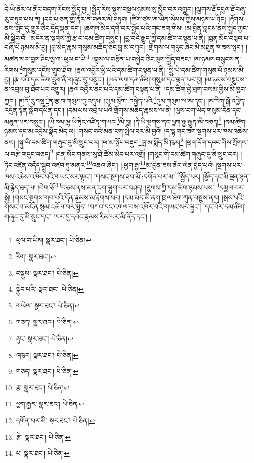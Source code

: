 དེ་ཡི་ནོར་ལ་ནོར་བདག་ལོངས་སྤྱོད་བྱ། །སྤྱོད་རེས་སྡུག་བསྔལ་ཉམས་སུ་མྱོང་བར་འགྱུར། །ལྕགས་རྡོ་དངུལ་རྡོ་བཞུ་རུ་བཏུབ་པས་ན། །དད་པ་ཅན་གྱི་ནོར་ནི་བཞུར་མི་བཏུབ། །ཚིག་ཙམ་མ་ཡིན་སེམས་ཀྱིས་མཉམ་པ་ཉིད། །རྟོགས་ནས་ཀློང་དུ་གྱུར་ཅིང་དྲོད་ལྡན་དང་། །ཆགས་མེད་དགེ་བར་སྤྱོད་པའི་གང་ཟག་གིས། །མ་བྱིན་བླངས་ནས་སྤྱད་ཀྱང་མི་སྒྲིབ་བོ། །མདོར་ན་སྔགས་ཀྱི་རྩ་བ་དམ་ཚིག་བསྲུང་། །བྱ་བའི་རྒྱུད་ཀྱི་དམ་ཚིག་བསྟན་པ་ནི། །ཐུན་མོང་བསླབ་པ་བཞི་པོ་ཉམས་མི་བྱ། །བླ་མེད་རྣམ་གསུམ་མཆོད་ཅིང་བླ་མ་བཀུར། །གྲོགས་ལ་གདུང་ཞིང་མི་མཐུན་ཁ་ཟས་སྤང་། །མཚན་མར་བྱས་ཤིང་ལྷ་ལ་:ཕུལ་བ་ཡི།\footnote{ཕུལ་བ་ཡིས།  སྣར་ཐང་།  པེ་ཅིན། } །ཁྲུས་ལ་བརྩོན་པ་བསྐྱེད་ཅིང་ལུས་སྤྱོད་བཟང་། །མ་ཉམས་བསྲུངས་ན་རིགས་\footnote{རིག་  སྣར་ཐང་། }གསུམ་དངོས་གྲུབ་ཐོབ། །རྣལ་འབྱོར་ཕྱི་པའི་དམ་ཚིག་བསྟན་པ་ནི། །སྤྱི་ཡི་དམ་ཚིག་གསུམ་པོ་ཉམས་མི་བྱ། །རྩ་བའི་དམ་ཚིག་དྲུག་ནི་གཞུང་དུ་བསྲུང་། །ཡན་ལག་དམ་ཚིག་གསུམ་དང་ལྡན་པར་བྱ། །མ་ཉམས་བསྲུངས་ན་འབྲས་བུ་ཐོབ་པར་འགྱུར། །རྣལ་འབྱོར་ནང་པའི་དམ་ཚིག་བསྟན་པ་ནི། །དམ་ཚིག་བྱེ་བྲག་བསམ་གྱིས་མི་ཁྱབ་ཀྱང་། །མདོ་རུ་བསྡུ་\footnote{བསྡུས་  སྣར་ཐང་།  པེ་ཅིན། }ན་རྩ་བ་གསུམ་དུ་འདུས། །ལུས་སྲོག་:བསྐྱེད་པའི་\footnote{སྐྱེད་པའི་  སྣར་ཐང་།  པེ་ཅིན། }དུས་གསུམ་ཕ་མ་དང་། །མ་རིག་སྒོ་འབྱེད་འདྲེན་སྟོན་སློབ་དཔོན་དང་། །དམ་པས་འབྲེལ་པའི་གྲོགས་མཆེད་རྣམས་ལ་ནི། །ལུས་ངག་ཡིད་གསུམ་དོན་དང་མཐུན་པར་བསྲུང་། །ཡི་དམ་ལྷ་ཡི་ཏིང་འཛིན་གཡང་\footnote{གཡེལ་  སྣར་ཐང་།  པེ་ཅིན། }མི་བྱ། །དེ་ཡི་སྔགས་དང་ཕྱག་རྒྱ་རྒྱུན་མི་བཅད།\footnote{གཅད།  སྣར་ཐང་།  པེ་ཅིན། } །དམ་ཚིག་ཉམས་དང་མ་འདྲེས་སྣོད་མེད་ལ། །གསང་བའི་མན་ངག་སྤེལ་བར་མི་བྱའོ། །ད་ལྟ་གང་ཟག་སྔགས་པར་ཁས་འཆེས་ནས། །སྐུ་ཡི་དམ་ཚིག་གཞུང་དུ་མི་སྲུང་བར། །ཕ་མ་སྤོང་བརྡུང་\footnote{རྡུང་  སྣར་ཐང་།  པེ་ཅིན། }བླ་མ་སྨོད་མི་ཁུར།\footnote{འཁུར།  སྣར་ཐང་།  པེ་ཅིན། } །ཕྲག་དོག་དབང་གིས་གྲོགས་ལ་བརྩེ་གདུང་བཅད།\footnote{གཅད།  སྣར་ཐང་།  པེ་ཅིན། } །ངན་སོང་གནས་སུ་ཐེ་ཚོམ་མེད་པར་འགྲོ། །གསུང་གི་དམ་ཚིག་གཞུང་དུ་མི་སྲུང་བར། །ཏིང་འཛིན་འདོད་སྒྲུབ་འཛབ་ཏུ་མནའ་\footnote{རྣ་  སྣར་ཐང་།  པེ་ཅིན། }འཆའ་ཞིང་། །:ཕྱག་རྒྱ་\footnote{ཕྱག་རྒྱར་  སྣར་ཐང་།  པེ་ཅིན། }མ་བྱིན་ཟས་ནོར་ལེན་བྱེད་པའི། །སྔགས་པར་ཁས་འཆེས་འཁོར་བའི་གཡང་སར་ལྟུང་། །གསང་སྔགས་ཟབ་མོ་:དགོན་པར་མ་\footnote{དགོན་པར་མི་  སྣར་ཐང་།  པེ་ཅིན། }སྤྱོད་པར། །སྣོད་དང་མི་ལྡན་ཉན་མི་རྙེད་ཐད་ལ། །བེག་ཅོ་\footnote{རྩེ་  སྣར་ཐང་།  པེ་ཅིན། }བཅས་ནས་མན་ངག་ལྷུག་པར་བཤད། །ཐུགས་ཀྱི་དམ་ཚིག་ཉམས་པས་\footnote{པ་  སྣར་ཐང་།  པེ་ཅིན། }དམྱལ་བར་སྐྱེ། །གསང་སྔགས་གབ་པའི་དོན་རྣམས་མ་རྟོགས་པར། །དམ་མེད་མི་ནག་ཁྲལ་ཐེག་ཀུན་བསྡུས་ནས། །སྦས་པའི་གསང་བ་མངོན་སུམ་འཆོལ་བར་སྤྱོད། །བཀའ་དང་འགལ་བས་འཁོར་བའི་གཡང་སར་ལྟུང་། །དང་པོར་དམ་ཚིག་གཞུང་དུ་མི་སྲུང་དང་། །བར་དུ་དབང་རྣམས་རིམ་པར་མི་ནོད་དང་། །
